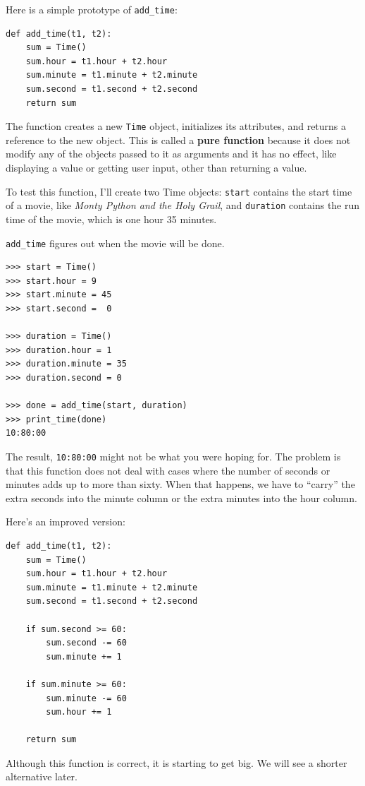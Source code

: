 \documentclass[10pt]{book}
\begin{document}
Here is a simple prototype of \verb"add_time":

\begin{verbatim}
def add_time(t1, t2):
    sum = Time()
    sum.hour = t1.hour + t2.hour
    sum.minute = t1.minute + t2.minute
    sum.second = t1.second + t2.second
    return sum
\end{verbatim}
%
The function creates a new {\tt Time} object, initializes its
attributes, and returns a reference to the new object.  This is called
a {\bf pure function} because it does not modify any of the objects
passed to it as arguments and it has no effect,
like displaying a value or getting user input, 
other than returning a value.

To test this function, I'll create two Time objects: {\tt start}
contains the start time of a movie, like {\em Monty Python and the
Holy Grail}, and {\tt duration} contains the run time of the movie,
which is one hour 35 minutes.

\verb"add_time" figures out when the movie will be done.

\begin{verbatim}
>>> start = Time()
>>> start.hour = 9
>>> start.minute = 45
>>> start.second =  0

>>> duration = Time()
>>> duration.hour = 1
>>> duration.minute = 35
>>> duration.second = 0

>>> done = add_time(start, duration)
>>> print_time(done)
10:80:00
\end{verbatim}
%
The result, {\tt 10:80:00} might not be what you were hoping
for.  The problem is that this function does not deal with cases where the
number of seconds or minutes adds up to more than sixty.  When that
happens, we have to ``carry'' the extra seconds into the minute column
or the extra minutes into the hour column.

Here's an improved version:

\begin{verbatim}
def add_time(t1, t2):
    sum = Time()
    sum.hour = t1.hour + t2.hour
    sum.minute = t1.minute + t2.minute
    sum.second = t1.second + t2.second

    if sum.second >= 60:
        sum.second -= 60
        sum.minute += 1

    if sum.minute >= 60:
        sum.minute -= 60
        sum.hour += 1

    return sum
\end{verbatim}
%
Although this function is correct, it is starting to get big.
We will see a shorter alternative later.
\end{document}
